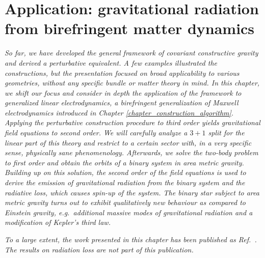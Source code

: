\chapter{Application: gravitational radiation from birefringent matter dynamics}
\label{chapter_weak_area}

\textit{So far, we have developed the general framework of covariant constructive gravity and derived a perturbative equivalent. A few examples illustrated the constructions, but the presentation focused on broad applicability to various geometries, without any specific bundle or matter theory in mind. In this chapter, we shift our focus and consider in depth the application of the framework to generalized linear electrodynamics, a birefringent generalization of Maxwell electrodynamics introduced in Chapter \ref{chapter_construction_algorithm}. Applying the perturbative construction procedure to third order yields gravitational field equations to second order. We will carefully analyze a $3+1$ split for the linear part of this theory and restrict to a certain sector with, in a very specific sense, physically sane phenomenology. Afterwards, we solve the two-body problem to first order and obtain the orbits of a binary system in area metric gravity. Building up on this solution, the second order of the field equations is used to derive the emission of gravitational radiation from the binary system and the radiative loss, which causes spin-up of the system. The binary star subject to area metric gravity turns out to exhibit qualitatively new behaviour as compared to Einstein gravity, e.g.~additional massive modes of gravitational radiation and a modification of Kepler's third law.}

\textit{To a large extent, the work presented in this chapter has been published as Ref.~\cite{Alex_2020_2}. The results on radiation loss are not part of this publication.}

